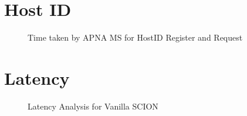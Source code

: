 \section{Host ID}
\begin{figure}[th!!]
\centering
\noindent
{}
\decoRule
\caption[HostID Operations]{Time taken by APNA MS for HostID Register and Request}
\label{fig:perf_ephid}
\end{figure}

\section{Latency}
\begin{figure}[th!!]
\centering
\noindent
{}
\decoRule
\caption[Latency Analysis]{Latency Analysis for Vanilla SCION}
\label{fig:perf_ephid}
\end{figure}